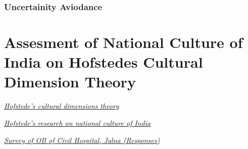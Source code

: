 \documentclass{article}
\begin{document}
\subsubsection{Uncertainity Aviodance}



\section{Assesment of National Culture of India on Hofstedes Cultural Dimension Theory}



\begin{thebibliography}{99}

    {\em \href{https://en.wikipedia.org/wiki/Hofstede%27s_cultural_dimensions_theory#Dimensions_of_national_culturess/}{Hofstede's cultural dimensions theory}}

    {\em \href{https://www.hofstede-insights.com/country-comparison/india/}{Hofstede's research on national culture of India}}

    {\em \href{https://docs.google.com/spreadsheets/d/13JBPbaedCzGmHHtawIFe-Poizsp84CtahEr07WUdKAw/edit?usp=sharing}{Survey of OB of Civil Hospital, Jalna (Responses)}}

\end{thebibliography}
\end{document}
